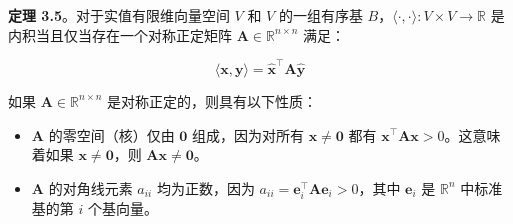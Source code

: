 \textbf{定理 3.5}。对于实值有限维向量空间 $ V $ 和 $ V $ 的一组有序基 $ B $，$ \langle \cdot, \cdot \rangle : V \times V \to \mathbb{R} $ 是内积当且仅当存在一个对称正定矩阵 $ \boldsymbol{A} \in \mathbb{R}^{n \times n} $ 满足：

\begin{equation}
\langle \boldsymbol{x}, \boldsymbol{y} \rangle = \hat{\boldsymbol{x}}^\top \boldsymbol{A} \hat{\boldsymbol{y}}
\tag{3.15}\label{eq:3-15}
\end{equation}

如果 $ \boldsymbol{A} \in \mathbb{R}^{n \times n} $ 是对称正定的，则具有以下性质：

\begin{itemize}
\item $ \boldsymbol{A} $ 的零空间（核）仅由 $ \boldsymbol{0} $ 组成，因为对所有 $ \boldsymbol{x} \neq \boldsymbol{0} $ 都有 $ \boldsymbol{x}^\top \boldsymbol{A} \boldsymbol{x} > 0 $。这意味着如果 $ \boldsymbol{x} \neq \boldsymbol{0} $，则 $ \boldsymbol{A} \boldsymbol{x} \neq \boldsymbol{0} $。
\item $ \boldsymbol{A} $ 的对角线元素 $ a_{ii} $ 均为正数，因为 $ a_{ii} = \boldsymbol{e}_i^\top \boldsymbol{A} \boldsymbol{e}_i > 0 $，其中 $ \boldsymbol{e}_i $ 是 $ \mathbb{R}^n $ 中标准基的第 $ i $ 个基向量。
\end{itemize}
